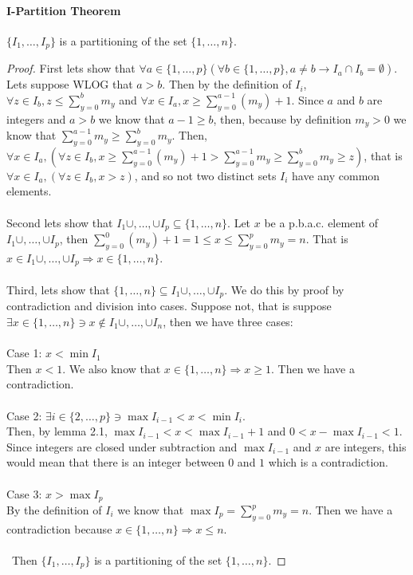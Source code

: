 \documentclass{article}
\begin{document}
\paragraph{I-Partition Theorem}
$\{I_1, \ldots, I_p\}$ is a partitioning of the set $\{1, \ldots, n\}$.
\begin{proof}
First lets show that $\forall a \in \{1, \ldots, p\}(\forall b \in \{1, \ldots, p\}, a \neq b \rightarrow I_a \cap I_b = \emptyset)$. Lets suppose WLOG that $a > b$. Then by the definition of $I_i$, $\forall z \in I_b, z \leq \sum_{y = 0}^bm_y$ and $\forall x \in I_a, x \geq \sum_{y = 0}^{a - 1}(m_y) + 1$. Since $a$ and $b$ are integers and $a > b$ we know that $a - 1 \geq b$, then, because by definition $m_y > 0$ we know that $\sum_{y = 0}^{a - 1}m_y \geq \sum_{y = 0}^bm_y$. Then, $\forall x \in I_a, (\forall z \in I_b, x \geq \sum_{y = 0}^{a - 1}(m_y) + 1 > \sum_{y = 0}^{a - 1}m_y \geq \sum_{y = 0}^bm_y \geq z)$, that is $\forall x \in I_a, (\forall z \in I_b, x > z)$, and so not two distinct sets $I_i$ have any common elements.\\\\
Second lets show that $I_1 \cup, \ldots, \cup I_p \subseteq \{1, \ldots, n\}$. Let $x$ be a p.b.a.c. element of $I_1 \cup, \ldots, \cup I_p$, then $\sum_{y = 0}^0(m_y) + 1 = 1 \leq x \leq \sum_{y = 0}^pm_y = n$. That is $x \in I_1 \cup, \ldots, \cup I_p \Rightarrow x \in \{1, \ldots, n\}$.\\\\
Third, lets show that $\{1, \ldots, n\} \subseteq I_1 \cup, \ldots, \cup I_p$. We do this by proof by contradiction and division into cases. Suppose not, that is suppose $\exists x \in \{1, \ldots, n\} \ni x \notin I_1 \cup, \ldots, \cup I_n$, then we have three cases:\\\\
Case 1: $x < \min{I_1}$ \\
Then $x < 1$. We also know that $x \in \{1, \ldots, n\} \Rightarrow x \geq 1$. Then we have a contradiction.\\\\
Case 2: $\exists i \in \{2, \ldots, p\} \ni \max{I_{i - 1}} < x < \min{I_i}$.\\
Then, by lemma 2.1, $\max{I_{i - 1}} < x < \max{I_{i - 1}} + 1$ and $0 < x - \max{I_{i - 1}} < 1$. Since integers are closed under subtraction and $\max{I_{i - 1}}$ and $x$ are integers, this would mean that there is an integer between $0$ and $1$ which is a contradiction.\\\\
Case 3: $x > \max{I_p}$\\
By the definition of $I_i$ we know that $\max{I_p} = \sum_{y = 0}^{p}m_y = n$. Then we have a contradiction because $x \in \{1, \ldots, n\} \Rightarrow x \leq n$.\\\\\
Then $\{I_1, \ldots, I_p\}$ is a partitioning of the set $\{1, \ldots, n\}$.
\end{proof}
\end{document}
